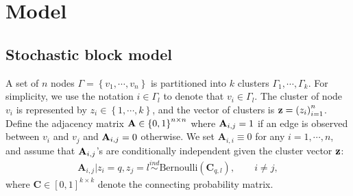 
\section{Model} %


\subsection{Stochastic block model} %
A set of $n$ nodes $\Gamma=\left\{ v_1,\cdots,v_n \right\}$ is partitioned into $k$ clusters $\Gamma_1,\cdots,\Gamma_k$. For simplicity, we use the notation $i\in\Gamma_l$ to denote that $v_i\in\Gamma_l$. The cluster of node $v_i$ is represented by $z_i\in \left\{ 1,\cdots,k \right\}$, and the vector of clusters is $\mathbf{z}=\left( z_i \right)_{i=1}^n $. 
Define the adjacency matrix $\mathbf{A}\in \left\{ 0,1\right\}^{n\times n}$ where  $\mathbf{A}_{i,j}= 1$ if an edge is observed between $v_i$ and $v_j$ and $\mathbf{A}_{i,j}=0$ otherwise.
We set $\mathbf{A}_{i,i}\equiv 0$  for any $i=1,\cdots,n$, 
and assume that $\mathbf{A}_{i,j}$'s are conditionally independent given the cluster vector $\mathbf{z}$:
\begin{align*}
\mathbf{A}_{i,j}|z_i=q,z_j=l \overset{ind}{\sim} \text{Bernoulli}(\mathbf{C}_{q,l}), \qquad i\neq j,
\end{align*}
where $\mathbf{C}\in [0,1]^{k\times k}$ denote the  connecting probability matrix.



